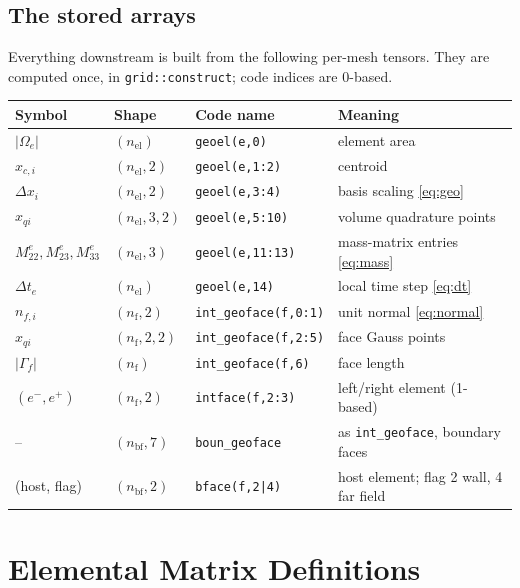 \documentclass[11pt,a4paper]{article}
\theoremstyle{remark}
\theoremstyle{definition}
\begin{document}
\subsection{The stored arrays}
Everything downstream is built from the following per-mesh tensors. They are computed once, in \texttt{grid::construct}; code indices are 0-based.

\begin{center}
\small
\begin{tabular}{llll}
\toprule
Symbol & Shape & Code name & Meaning\\
\midrule
$|\Omega_e|$ & $(n_{\mathrm{el}})$ & \texttt{geoel(e,0)} & element area\\
$x_{c,i}$ & $(n_{\mathrm{el}},2)$ & \texttt{geoel(e,1:2)} & centroid\\
$\Delta x_i$ & $(n_{\mathrm{el}},2)$ & \texttt{geoel(e,3:4)} & basis scaling \eqref{eq:geo}\\
$x_{qi}$ & $(n_{\mathrm{el}},3,2)$ & \texttt{geoel(e,5:10)} & volume quadrature points\\
$M^e_{22},M^e_{23},M^e_{33}$ & $(n_{\mathrm{el}},3)$ & \texttt{geoel(e,11:13)} & mass-matrix entries \eqref{eq:mass}\\
$\Delta t_e$ & $(n_{\mathrm{el}})$ & \texttt{geoel(e,14)} & local time step \eqref{eq:dt}\\
$n_{f,i}$ & $(n_{\mathrm{f}},2)$ & \texttt{int\_geoface(f,0:1)} & unit normal \eqref{eq:normal}\\
$x_{qi}$ & $(n_{\mathrm{f}},2,2)$ & \texttt{int\_geoface(f,2:5)} & face Gauss points\\
$|\Gamma_f|$ & $(n_{\mathrm{f}})$ & \texttt{int\_geoface(f,6)} & face length\\
$(e^-,e^+)$ & $(n_{\mathrm{f}},2)$ & \texttt{intface(f,2:3)} & left/right element (1-based)\\
-- & $(n_{\mathrm{bf}},7)$ & \texttt{boun\_geoface} & as \texttt{int\_geoface}, boundary faces\\
(host, flag) & $(n_{\mathrm{bf}},2)$ & \texttt{bface(f,2|4)} & host element; flag 2 wall, 4 far field\\
\bottomrule
\end{tabular}
\end{center}

\section{Elemental Matrix Definitions}
\end{document}
